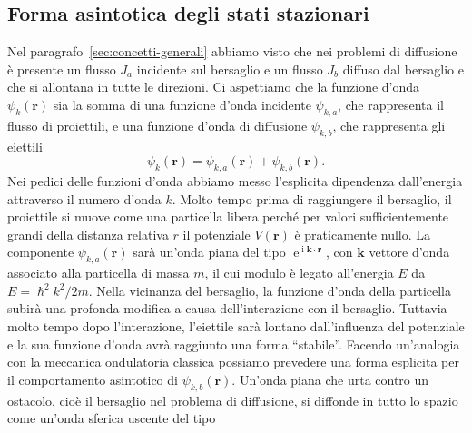 \documentclass[a4paper,fleqn,twoside,12pt]{article}
\DeclareMathOperator{\e}{\mathrm{e}} %
\DeclareMathOperator{\uimm}{\mathrm{i}} %
\begin{document}
\subsection{Forma asintotica degli stati stazionari}
\label{sec:forma-asintintotica}

Nel paragrafo~\ref{sec:concetti-generali} abbiamo visto che nei problemi di
diffusione è presente un flusso $J_{a}$ incidente sul bersaglio e un flusso
$J_{b}$ diffuso dal bersaglio e che si allontana in tutte le direzioni.  Ci
aspettiamo che la funzione d'onda $\psi_{k}(\bm{r})$ sia la somma di una
funzione d'onda incidente $\psi_{k,a}$, che rappresenta il flusso di proiettili,
e una funzione d'onda di diffusione $\psi_{k,b}$, che rappresenta gli eiettili
\begin{equation}
  \psi_{k}(\bm{r}) = \psi_{k,a}(\bm{r}) + \psi_{k,b}(\bm{r}).
\end{equation}
Nei pedici delle funzioni d'onda abbiamo messo l'esplicita dipendenza
dall'energia attraverso il numero d'onda $k$.  Molto tempo prima di raggiungere
il bersaglio, il proiettile si muove come una particella libera perché per
valori sufficientemente grandi della distanza relativa $r$ il potenziale
$V(\bm{r})$ è praticamente nullo.  La componente $\psi_{k,a}(\bm{r})$ sarà
un'onda piana del tipo $\e^{\uimm \bm{k}\cdot\bm{r}}$, con $\bm{k}$ vettore
d'onda associato alla particella di massa $m$, il cui modulo è legato
all'energia $E$ da $E = \hslash^{2}k^{2}/2m$.  Nella vicinanza del bersaglio, la
funzione d'onda della particella subirà una profonda modifica a causa
dell'interazione con il bersaglio.  Tuttavia molto tempo dopo l'interazione,
l'eiettile sarà lontano dall'influenza del potenziale e la sua funzione d'onda
avrà raggiunto una forma ``stabile''.
Facendo un'analogia con la meccanica ondulatoria classica possiamo prevedere una
forma esplicita per il comportamento asintotico di $\psi_{k,b}(\bm{r})$.
Un'onda piana che urta contro un ostacolo, cioè il bersaglio nel problema di
diffusione, si diffonde in tutto lo spazio come un'onda sferica uscente del tipo
\end{document}
